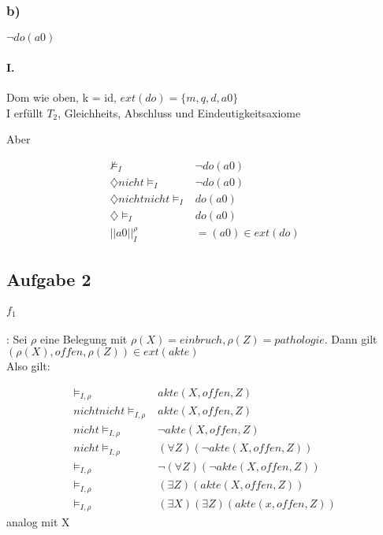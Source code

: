 \documentclass[12pt, a4paper]{article}
\begin{document}
\subsubsection*{b)}
$\lnot do(a0)$\\
\paragraph*{I.} Dom wie oben, k = id, $ext(do) = \{ m, q, d, a0 \}$\\
I erfüllt $T_2$, Gleichheits, Abschluss und Eindeutigkeitsaxiome

Aber 

\begin{equation}
\begin{split}
\nvDash_I &\lnot do(a0)\\
\diamondsuit nicht \vDash_I &\lnot do(a0)\\
\diamondsuit nicht nicht \vDash_I &do(a0)\\
\diamondsuit \vDash_I &do(a0)\\
||a0||^\rho_I &= (a0) \in ext(do)
\end{split}
\end{equation}

\subsection*{Aufgabe 2}

\paragraph*{$f_1$}: Sei $\rho$ eine Belegung mit $\rho(X) = einbruch, \rho(Z) = pathologie$. Dann gilt $(\rho(X), offen, \rho(Z)) \in ext(akte)$\\
Also gilt: 

\begin{equation}
\begin{split}
\vDash_{I, \rho}& akte(X, offen, Z)\\
nicht nicht \vDash_{I, \rho}& akte(X, offen, Z)\\
nicht \vDash_{I, \rho}& \lnot akte(X, offen, Z)\\
nicht \vDash_{I, \rho}& (\forall Z)(\lnot akte(X, offen, Z))\\
\vDash_{I, \rho}& \lnot (\forall Z)(\lnot akte(X, offen, Z))\\
\vDash_{I, \rho}&  (\exists Z)(akte(X, offen, Z))\\
\vDash_{I, \rho}& (\exists X)(\exists Z)(akte(x,offen,Z))
\end{split}
\end{equation}
analog mit X
\\
\end{document}
